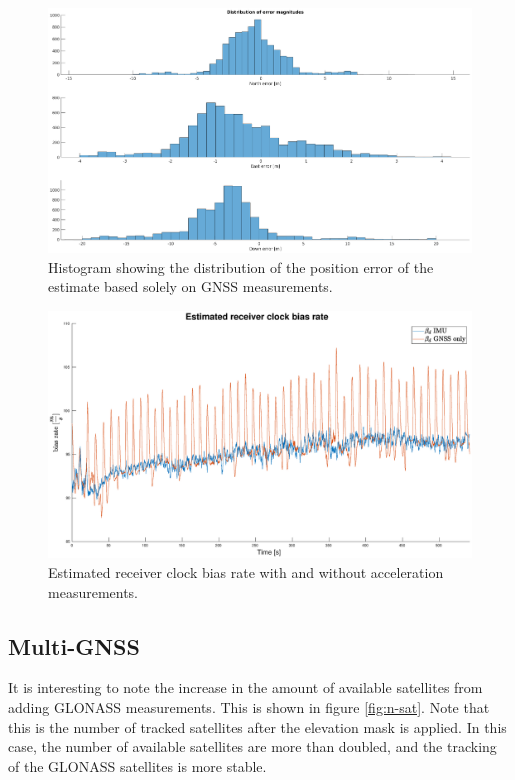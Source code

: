     \begin{figure}[!htbp]
        \hspace{-1.5cm}
        \includegraphics[scale=0.3]{Results/Images/error-hist-gnss.eps}
        \caption{Histogram showing the distribution of the position error of the estimate based solely on GNSS measurements.}
        \label{fig:error-hist-gnss}
    \end{figure}
    
    \begin{figure}[!htbp]
        \hspace{-1.5cm}
        \includegraphics[scale=0.3]{Results/Images/bias_rate.eps}
        \caption{Estimated receiver clock bias rate with and without acceleration measurements.}
        \label{fig:bias-rate}
    \end{figure}
    
    
    \subsection{Multi-GNSS}
    \label{sec:res:multi-gnss}
    It is interesting to note the increase in the amount of available satellites from adding GLONASS measurements. This is shown in figure \ref{fig:n-sat}. Note that this is the number of tracked satellites after the elevation mask is applied. In this case, the number of available satellites are more than doubled, and the tracking of the GLONASS satellites is more stable.\\
    
